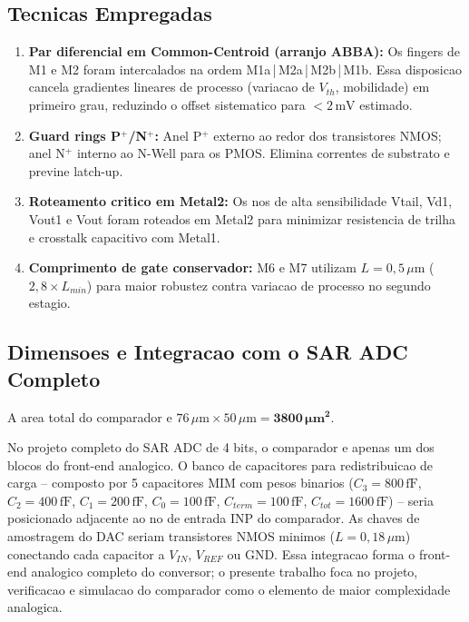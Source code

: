 \documentclass[12pt, a4paper]{article}
\begin{document}
\subsection{Tecnicas Empregadas}

\begin{enumerate}[noitemsep]
  \item \textbf{Par diferencial em Common-Centroid (arranjo ABBA):}
        Os fingers de M1 e M2 foram intercalados na ordem M1a\,|\,M2a\,|\,M2b\,|\,M1b.
        Essa disposicao cancela gradientes lineares de processo (variacao de $V_{th}$,
        mobilidade) em primeiro grau, reduzindo o offset sistematico para $< 2\,\text{mV}$
        estimado.

  \item \textbf{Guard rings P$^+$/N$^+$:}
        Anel P$^+$ externo ao redor dos transistores NMOS; anel N$^+$ interno ao N-Well
        para os PMOS. Elimina correntes de substrato e previne latch-up.

  \item \textbf{Roteamento critico em Metal2:}
        Os nos de alta sensibilidade Vtail, Vd1, Vout1 e Vout foram roteados em Metal2
        para minimizar resistencia de trilha e crosstalk capacitivo com Metal1.

  \item \textbf{Comprimento de gate conservador:}
        M6 e M7 utilizam $L = 0{,}5\,\mu\text{m}$ ($2{,}8\times L_{min}$) para maior
        robustez contra variacao de processo no segundo estagio.
\end{enumerate}

\subsection{Dimensoes e Integracao com o SAR ADC Completo}

A area total do comparador e $76\,\mu\text{m} \times 50\,\mu\text{m} =
\mathbf{3800\,\mu\text{m}^2}$.

No projeto completo do SAR ADC de 4 bits, o comparador e apenas um dos blocos do
front-end analogico. O banco de capacitores para redistribuicao de carga -- composto
por 5 capacitores MIM com pesos binarios ($C_3=800\,\text{fF}$, $C_2=400\,\text{fF}$,
$C_1=200\,\text{fF}$, $C_0=100\,\text{fF}$, $C_{term}=100\,\text{fF}$,
$C_{tot}=1600\,\text{fF}$) -- seria posicionado adjacente ao no de entrada INP do
comparador. As chaves de amostragem do DAC seriam transistores NMOS minimos
($L=0{,}18\,\mu\text{m}$) conectando cada capacitor a $V_{IN}$, $V_{REF}$ ou GND.
Essa integracao forma o front-end analogico completo do conversor; o presente
trabalho foca no projeto, verificacao e simulacao do comparador como o elemento
de maior complexidade analogica.
\end{document}
